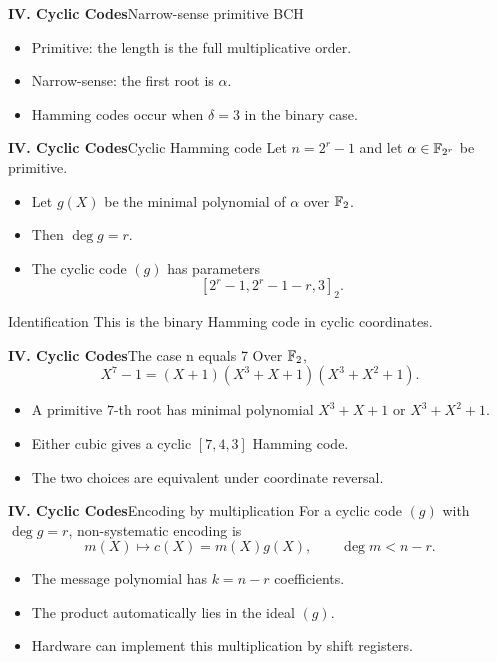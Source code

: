 \begin{frame}{\textbf{IV. Cyclic Codes}}{Narrow-sense primitive BCH}
\small
{}
\begin{itemize}
  \item Primitive: the length is the full multiplicative order.
  \item Narrow-sense: the first root is $\alpha$.
  \item Hamming codes occur when $\delta=3$ in the binary case.
\end{itemize}
\end{frame}

\begin{frame}{\textbf{IV. Cyclic Codes}}{Cyclic Hamming code}
\small
Let $n=2^r-1$ and let $\alpha\in\mathbb{F}_{2^r}$ be primitive.
\begin{itemize}
  \item Let $g(X)$ be the minimal polynomial of $\alpha$ over $\mathbb{F}_2$.
  \item Then $\deg g=r$.
  \item The cyclic code $(g)$ has parameters
  \[
    [2^r-1,2^r-1-r,3]_2.
  \]
\end{itemize}
\begin{block}{Identification}
This is the binary Hamming code in cyclic coordinates.
\end{block}
\end{frame}

\begin{frame}{\textbf{IV. Cyclic Codes}}{The case n equals 7}
\small
Over $\mathbb{F}_2$,
\[
  X^7-1=(X+1)(X^3+X+1)(X^3+X^2+1).
\]
\begin{itemize}
  \item A primitive $7$-th root has minimal polynomial $X^3+X+1$ or $X^3+X^2+1$.
  \item Either cubic gives a cyclic $[7,4,3]$ Hamming code.
  \item The two choices are equivalent under coordinate reversal.
\end{itemize}
\end{frame}

\begin{frame}{\textbf{IV. Cyclic Codes}}{Encoding by multiplication}
\small
For a cyclic code $(g)$ with $\deg g=r$, non-systematic encoding is
\[
  m(X)\longmapsto c(X)=m(X)g(X),\qquad \deg m< n-r.
\]
\begin{itemize}
  \item The message polynomial has $k=n-r$ coefficients.
  \item The product automatically lies in the ideal $(g)$.
  \item Hardware can implement this multiplication by shift registers.
\end{itemize}
\end{frame}

